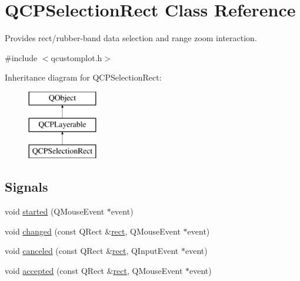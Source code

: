 \hypertarget{class_q_c_p_selection_rect}{}\section{Q\+C\+P\+Selection\+Rect Class Reference}
\label{class_q_c_p_selection_rect}


Provides rect/rubber-\/band data selection and range zoom interaction.  




{\ttfamily \#include $<$qcustomplot.\+h$>$}

Inheritance diagram for Q\+C\+P\+Selection\+Rect\+:\begin{figure}[H]
\begin{center}
\leavevmode
\includegraphics[height=3.000000cm]{d6/dab/class_q_c_p_selection_rect}
\end{center}
\end{figure}
\subsection*{Signals}
\begin{DoxyCompactItemize}
\item 
void \mbox{\hyperlink{class_q_c_p_selection_rect_a7b7162d19f4f2174d3644ff1a5d335aa}{started}} (Q\+Mouse\+Event $\ast$event)
\item 
void \mbox{\hyperlink{class_q_c_p_selection_rect_a1bab11026bca52740c2e6682623e6964}{changed}} (const Q\+Rect \&\mbox{\hyperlink{class_q_c_p_selection_rect_a3812115ae4dfe2855bf1e58331c14805}{rect}}, Q\+Mouse\+Event $\ast$event)
\item 
void \mbox{\hyperlink{class_q_c_p_selection_rect_aeb82009393c90130102dccf36477b906}{canceled}} (const Q\+Rect \&\mbox{\hyperlink{class_q_c_p_selection_rect_a3812115ae4dfe2855bf1e58331c14805}{rect}}, Q\+Input\+Event $\ast$event)
\item 
void \mbox{\hyperlink{class_q_c_p_selection_rect_a15a43542e1f7b953a44c260b419e6d2c}{accepted}} (const Q\+Rect \&\mbox{\hyperlink{class_q_c_p_selection_rect_a3812115ae4dfe2855bf1e58331c14805}{rect}}, Q\+Mouse\+Event $\ast$event)
\end{DoxyCompactItemize}
